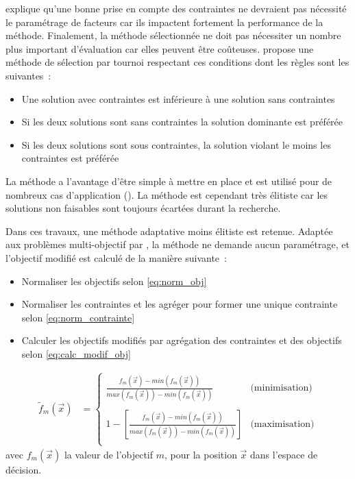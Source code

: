 \cite{Coello2002} explique qu’une bonne prise en compte des contraintes ne devraient
pas nécessité le paramétrage de facteurs car ils impactent
fortement la performance de la méthode. Finalement, la méthode sélectionnée ne
doit pas nécessiter un nombre plus important d’évaluation car elles peuvent être coûteuses.
\cite{Deb2000311} propose une méthode de sélection par tournoi respectant ces conditions
dont les règles sont les suivantes~:
\begin{itemize}
  \item Une solution avec contraintes est inférieure à une solution sans contraintes
  \item Si les deux solutions sont sans contraintes la solution dominante est préférée
  \item Si les deux solutions sont sous contraintes, la solution violant le moins les contraintes est préférée
\end{itemize}
La méthode a l’avantage d’être simple à mettre en place et est utilisé pour de nombreux
cas d’application (). La méthode est cependant
très élitiste car les solutions non faisables sont toujours écartées durant la
recherche.

Dans ces travaux, une méthode adaptative moins élitiste est retenue. Adaptée
aux problèmes multi-objectif par \cite{Woldesenbet20073077}, la méthode ne demande
aucun paramétrage, et l’objectif modifié est calculé de la manière suivante~:
\begin{itemize}
  \item Normaliser les objectifs selon \eqref{eq:norm_obj}
  \item Normaliser les contraintes et les agréger pour former une unique contrainte selon \eqref{eq:norm_contrainte}
  \item Calculer les objectifs modifiés par agrégation des contraintes et des objectifs selon \eqref{eq:calc_modif_obj}
\end{itemize}

\begin{align}\label{eq:norm_obj}
  \tilde{f}_{m}(\vec{x}) &= \begin{cases}
    \frac{f_{m}(\vec{x}) - min(f_{m}(\vec{x}))}{max(f_{m}(\vec{x})) - min(f_{m}(\vec{x}))}
    & \text{(minimisation)} \\ \\ 1 - \left[\frac{f_{m}(\vec{x}) -
    min(f_{m}(\vec{x}))}{max(f_{m}(\vec{x})) - min(f_{m}(\vec{x}))}\right] &
    \text{(maximisation)} \\
  \end{cases}
\end{align}
avec $f_{m}(\vec{x})$ la valeur de l’objectif $m$, pour la position $\vec{x}$ dans l’espace de décision.

